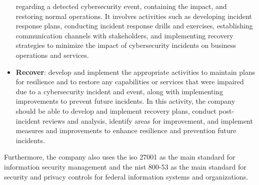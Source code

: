 \begin{multicols}{2}
\begin{itemize}
                  regarding a detected cybersecurity event, containing the impact, and restoring normal operations. It involves activities such as
                  developing incident response plans, conducting incident response drills and exercises, establishing communication
                  channels with stakeholders, and implementing recovery strategies to minimize the impact of cybersecurity incidents
                  on business operations and services.
            \item \textbf{Recover}: develop and implement the appropriate activities to maintain plans for resilience and to restore any
                  capabilities or services that were impaired due to a cybersecurity incident and event, along with implementing improvements
                  to prevent future incidents. In this activity, the company should be able to develop and implement recovery plans, conduct
                  post-incident reviews and analysis, identify areas for improvement, and implement measures and improvements to enhance
                  resilience and prevention future incidents.
      \end{itemize}
      Furthermore, the company also uses the \acrshort{iso} 27001 as the main standard for information security management
      and the \acrshort{nist} 800-53 as the main standard for security and privacy controls for federal information systems and
      organizations.

\end{multicols}

